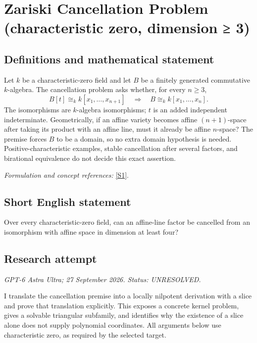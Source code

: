 \documentclass[11pt]{article}
\begin{document}
\section*{\texorpdfstring{Zariski Cancellation Problem (characteristic zero, dimension ≥ 3)}{Zariski Cancellation Problem (characteristic zero, dimension ≥ 3)}}\label{30006919}
\subsection{Definitions and mathematical statement}
Let $k$ be a characteristic-zero field and let $B$ be a finitely generated commutative $k$-algebra. The cancellation problem asks whether, for every $n\ge3$,
\[
 B[t]\cong_k k[x_1,\ldots,x_{n+1}]
 \quad\Longrightarrow\quad B\cong_k k[x_1,\ldots,x_n].
\]
The isomorphisms are $k$-algebra isomorphisms; $t$ is an added independent indeterminate. Geometrically, if an affine variety becomes affine $(n+1)$-space after taking its product with an affine line, must it already be affine $n$-space? The premise forces $B$ to be a domain, so no extra domain hypothesis is needed. Positive-characteristic examples, stable cancellation after several factors, and birational equivalence do not decide this exact assertion.
\par\smallskip\textit{Formulation and concept references:} \href{https://arxiv.org/pdf/2208.14736}{[S1]}.

\subsection{Short English statement}
Over every characteristic-zero field, can an affine-line factor be cancelled from an isomorphism with affine space in dimension at least four?
\subsection{Research attempt}
\textit{GPT-6 Astra Ultra; 27 September 2026. Status: UNRESOLVED.}

I translate the cancellation premise into a locally nilpotent derivation
with a slice and prove that translation explicitly. This exposes a
concrete kernel problem, gives a solvable triangular subfamily, and
identifies why the existence of a slice alone does not supply polynomial
coordinates. All arguments below use characteristic zero, as required
by the selected target.
\end{document}
